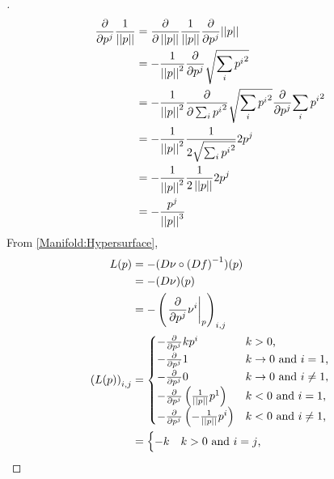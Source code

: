 \documentclass[../main.tex]{subfiles}
\begin{document}
\begin{proof}[]
    \begin{align*}
        \frac{\partial}{\partial\tensor{p}{^j}}{\frac{1}{\norm{p}}}
        &= \frac{\partial}{\partial\norm{p}}{\frac{1}{\norm{p}}}\frac{\partial}{\partial\tensor{p}{^j}}{\norm{p}} \\
        &= {-\frac{1}{\norm{p}^2}}\frac{\partial}{\partial\tensor{p}{^j}}{\sqrt{\sum_i{{\tensor{p}{^i}}^2}}} \\
        &= {-\frac{1}{\norm{p}^2}}\frac{\partial}{\partial \sum_i{{\tensor{p}{^i}}^2}}{\sqrt{\sum_i{{\tensor{p}{^i}}^2}}}\frac{\partial}{\partial\tensor{p}{^j}}{\sum_i{{\tensor{p}{^i}}^2}} \\
        &= {-\frac{1}{\norm{p}^2}}\frac{1}{2\sqrt{\sum_i{{\tensor{p}{^i}}^2}}}{2{{\tensor{p}{^j}}}} \\
        &= {-\frac{1}{\norm{p}^2}}\frac{1}{2\norm{p}}{2{{\tensor{p}{^j}}}} \\
        &= -\frac{\tensor{p}{^j}}{\norm{p}^3}
    \end{align*}
    From \cref{Manifold:Hypersurface},
    \begin{align*}
        L(p)
        &= - (D\nu \circ \left(Df\right)^{-1})(p) \\
        &= - (D\nu)(p) \\
        &= - \left(\left.\frac{\partial}{\partial\tensor{p}{^j}}\tensor{\nu}{^i}\right|_p\right)_{i,j} \\
        \left(L(p)\right)_{i,j}
        &= \begin{cases}
            - \frac{\partial}{\partial\tensor{p}{^j}} k\tensor{p}{^i} & \text{$k>0$,} \\
            - \frac{\partial}{\partial\tensor{p}{^j}} 1 & \text{$k\to 0$ and $i=1$,} \\
            - \frac{\partial}{\partial\tensor{p}{^j}} 0 & \text{$k\to 0$ and $i\ne1$,} \\
            - \frac{\partial}{\partial\tensor{p}{^j}} \left({\frac{1}{\norm{p}}}\tensor{p}{^1}\right) & \text{$k<0$ and $i=1$,} \\
            - \frac{\partial}{\partial\tensor{p}{^j}} \left(-{\frac{1}{\norm{p}}}\tensor{p}{^i}\right) & \text{$k<0$ and $i\ne 1$,} \\
          \end{cases} \\
          &= \begin{cases}
              - k & \text{$k>0$ and $i=j$,} \\

\end{cases}
\end{align*}
\end{proof}
\end{document}
